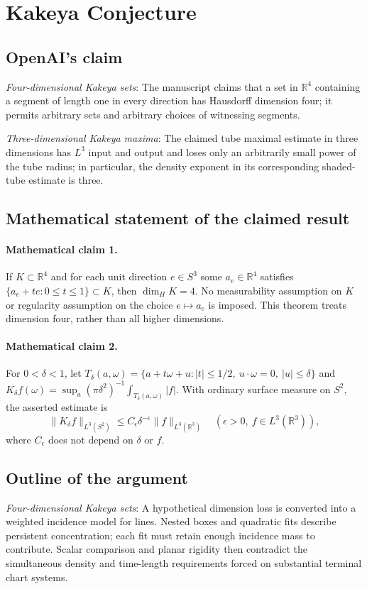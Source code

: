 \documentclass[11pt]{article}
\begin{document}
\section*{Kakeya Conjecture}

\subsection{OpenAI's claim}
\textit{Four-dimensional Kakeya sets}: The manuscript claims that a set in $\mathbb R^4$ containing a segment of length one in every direction has Hausdorff dimension four; it permits arbitrary sets and arbitrary choices of witnessing segments.

\textit{Three-dimensional Kakeya maxima}: The claimed tube maximal estimate in three dimensions has $L^3$ input and output and loses only an arbitrarily small power of the tube radius; in particular, the density exponent in its corresponding shaded-tube estimate is three.

\subsection{Mathematical statement of the claimed result}
\paragraph{Mathematical claim 1.} If $K\subset\mathbb R^4$ and for each unit direction $e\in S^3$ some $a_e\in\mathbb R^4$ satisfies $\{a_e+te:0\le t\le1\}\subset K$, then $\dim_H K=4$. No measurability assumption on $K$ or regularity assumption on the choice $e\mapsto a_e$ is imposed. This theorem treats dimension four, rather than all higher dimensions.

\paragraph{Mathematical claim 2.} For $0<\delta<1$, let $T_\delta(a,\omega)=\{a+t\omega+u:|t|\le1/2,\ u\cdot\omega=0,\ |u|\le\delta\}$ and $K_\delta f(\omega)=\sup_a(\pi\delta^2)^{-1}\int_{T_\delta(a,\omega)}|f|$. With ordinary surface measure on $S^2$, the asserted estimate is \[\|K_\delta f\|_{L^3(S^2)}\le C_\epsilon\delta^{-\epsilon}\|f\|_{L^3(\mathbb R^3)}\quad(\epsilon>0,\ f\in L^3(\mathbb R^3)),\] where $C_\epsilon$ does not depend on $\delta$ or $f$.

\subsection{Outline of the argument}
\textit{Four-dimensional Kakeya sets}: A hypothetical dimension loss is converted into a weighted incidence model for lines. Nested boxes and quadratic fits describe persistent concentration; each fit must retain enough incidence mass to contribute. Scalar comparison and planar rigidity then contradict the simultaneous density and time-length requirements forced on substantial terminal chart systems.
\end{document}
